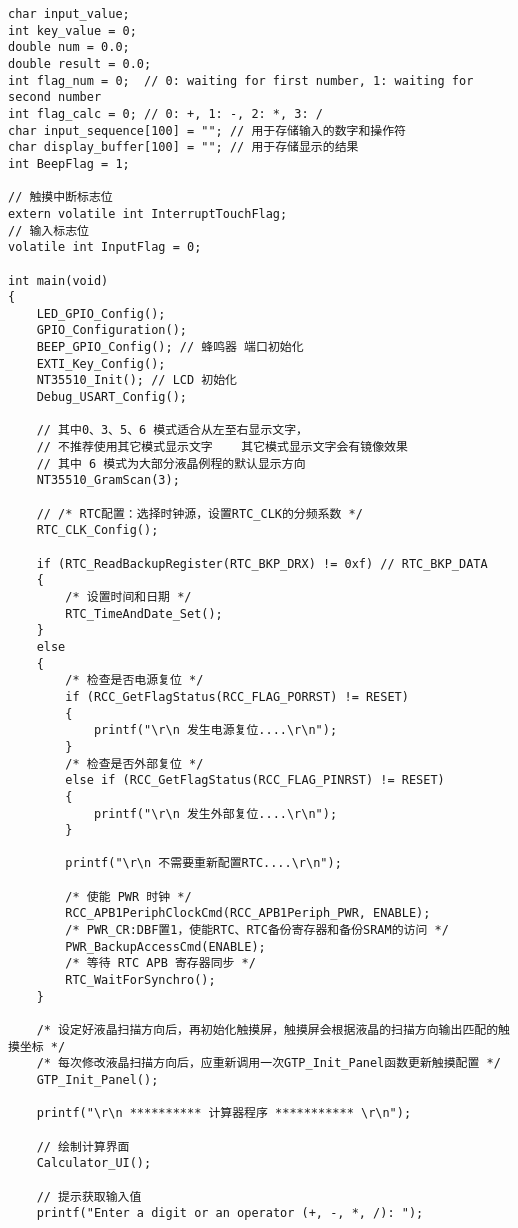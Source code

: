 \documentclass{theme-2639013-final}
\begin{document}
\begin{verbatim}
char input_value;
int key_value = 0;
double num = 0.0;
double result = 0.0;
int flag_num = 0;  // 0: waiting for first number, 1: waiting for second number
int flag_calc = 0; // 0: +, 1: -, 2: *, 3: /
char input_sequence[100] = ""; // 用于存储输入的数字和操作符
char display_buffer[100] = ""; // 用于存储显示的结果
int BeepFlag = 1;

// 触摸中断标志位
extern volatile int InterruptTouchFlag;
// 输入标志位
volatile int InputFlag = 0;

int main(void)
{
    LED_GPIO_Config();
    GPIO_Configuration();
    BEEP_GPIO_Config(); // 蜂鸣器 端口初始化
    EXTI_Key_Config();
    NT35510_Init(); // LCD 初始化
    Debug_USART_Config();

    // 其中0、3、5、6 模式适合从左至右显示文字，
    // 不推荐使用其它模式显示文字	其它模式显示文字会有镜像效果
    // 其中 6 模式为大部分液晶例程的默认显示方向
    NT35510_GramScan(3);

    // /* RTC配置：选择时钟源，设置RTC_CLK的分频系数 */
    RTC_CLK_Config();

    if (RTC_ReadBackupRegister(RTC_BKP_DRX) != 0xf) // RTC_BKP_DATA
    {
        /* 设置时间和日期 */
        RTC_TimeAndDate_Set();
    }
    else
    {
        /* 检查是否电源复位 */
        if (RCC_GetFlagStatus(RCC_FLAG_PORRST) != RESET)
        {
            printf("\r\n 发生电源复位....\r\n");
        }
        /* 检查是否外部复位 */
        else if (RCC_GetFlagStatus(RCC_FLAG_PINRST) != RESET)
        {
            printf("\r\n 发生外部复位....\r\n");
        }

        printf("\r\n 不需要重新配置RTC....\r\n");

        /* 使能 PWR 时钟 */
        RCC_APB1PeriphClockCmd(RCC_APB1Periph_PWR, ENABLE);
        /* PWR_CR:DBF置1，使能RTC、RTC备份寄存器和备份SRAM的访问 */
        PWR_BackupAccessCmd(ENABLE);
        /* 等待 RTC APB 寄存器同步 */
        RTC_WaitForSynchro();
    }

    /* 设定好液晶扫描方向后，再初始化触摸屏，触摸屏会根据液晶的扫描方向输出匹配的触摸坐标 */
    /* 每次修改液晶扫描方向后，应重新调用一次GTP_Init_Panel函数更新触摸配置 */
    GTP_Init_Panel();

    printf("\r\n ********** 计算器程序 *********** \r\n");

    // 绘制计算界面
    Calculator_UI();

    // 提示获取输入值
    printf("Enter a digit or an operator (+, -, *, /): ");


\end{verbatim}
\end{document}
